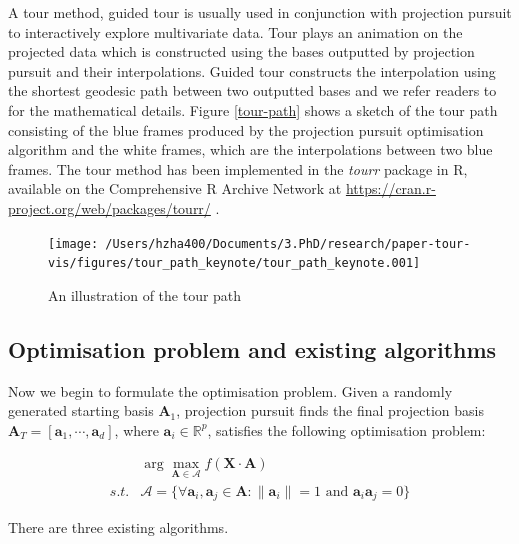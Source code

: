 \documentclass[12pt]{article}
\begin{document}
A tour method, guided tour is usually used in conjunction with
projection pursuit to interactively explore multivariate data. Tour
plays an animation on the projected data which is constructed using the
bases outputted by projection pursuit and their interpolations. Guided
tour constructs the interpolation using the shortest geodesic path
between two outputted bases and we refer readers to
\citet{buja2005computational} for the mathematical details. Figure
\ref{tour-path} shows a sketch of the tour path consisting of the blue
frames produced by the projection pursuit optimisation algorithm and the
white frames, which are the interpolations between two blue frames. The
tour method has been implemented in the \emph{tourr} package in R,
available on the Comprehensive R Archive Network at
\url{https://cran.r-project.org/web/packages/tourr/}
\citep{wickham2011tourrpackage}.

\begin{figure}
\texttt{[image: /Users/hzha400/Documents/3.PhD/research/paper-tour-vis/figures/tour\_path\_keynote/tour\_path\_keynote.001]} \caption{\label{tour-path}An illustration of the tour path}\label{fig:tour-path}
\end{figure}

\hypertarget{tour-optim}{%
\subsection{Optimisation problem and existing
algorithms}\label{tour-optim}}

Now we begin to formulate the optimisation problem. Given a randomly
generated starting basis \(\mathbf{A}_1\), projection pursuit finds the
final projection basis
\(\mathbf{A}_T = [\mathbf{a}_1, \cdots, \mathbf{a}_d]\), where
\(\mathbf{a}_i \in \mathbb{R}^{p}\), satisfies the following
optimisation problem:

\begin{align}
&\arg \max_{\mathbf{A} \in \mathcal{A}} f(\mathbf{X} \cdot \mathbf{A}) \\
s.t. & \mathcal{A} = \{ \forall \mathbf{a}_i, \mathbf{a}_j \in \mathbf{A}: \lVert \mathbf{a}_i \rVert = 1 \text{ and } \mathbf{a}_i \mathbf{a}_j = 0 \}
\end{align}

There are three existing algorithms.
\end{document}
